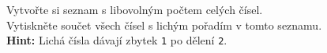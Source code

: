 \question[50]
Vytvořte si seznam s libovolným počtem celých čísel.\\
Vytiskněte součet všech čísel s lichým pořadím v tomto seznamu.\\
\textbf{Hint:} Lichá čísla dávají zbytek \texttt{1} po dělení \texttt{2}.